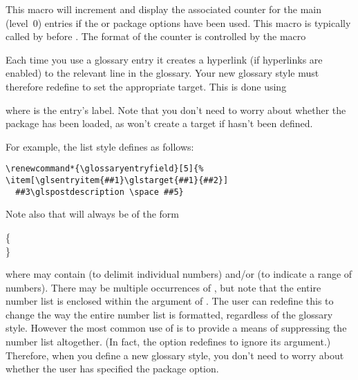 \documentclass[report]{nlctdoc}
\renewcommand*{\glossaryentryfield}[5]{%
    \item[\glsentryitem{#1}\glstarget{#1}{#2}]\mbox{}\newline
      #3\glspostdescription\space #5\newline}%
\newcommand*{\glostyle}[1]{\textsf{#1}\index{glossary styles:>#1={\protect\ttfamily#1}|main}}
\begin{document}
\begin{definition}[\DescribeMacro{\glsentryitem}]
\end{definition}
This macro will increment and display the associated counter for the
main (level~0) entries if the  or
 package options have been used. This macro
is typically called by  before . 
The format of the counter is controlled by the macro
\begin{definition}[\DescribeMacro{\glsentrycounterlabel}]
\end{definition}

Each time you use a glossary entry it creates a hyperlink (if
hyperlinks are enabled) to the relevant line in the glossary.
Your new glossary style must therefore redefine
 to set the appropriate target. This
is done using
\begin{definition}[\DescribeMacro{\glstarget}]
\end{definition}
where  is the entry's label. Note that you
don't need to worry about whether the  package has
been loaded, as  won't create a target if
 hasn't been defined.

For example, the 
\glostyle{list} style defines  as follows:
\begin{verbatim}
\renewcommand*{\glossaryentryfield}[5]{%
\item[\glsentryitem{##1}\glstarget{##1}{##2}] 
  ##3\glspostdescription \space ##5}
\end{verbatim}

Note also that  will always be of the form\\
\begin{definition}
\{\\
\}
\end{definition}
where 
may contain  (to delimit individual numbers) and/or
 (to indicate a range of numbers). There may be 
multiple occurrences of 
, but note
that the entire number list is enclosed within the argument
of \linebreak{}. The user can redefine this to change
the way the entire number list is formatted, regardless of 
the glossary style. However the most common use of
 is to provide a means of suppressing the
number list altogether. (In fact, the  option 
redefines  to ignore its argument.)
Therefore, when you define a new glossary style, you don't need
to worry about whether the user has specified the 
 package option.
\end{document}
